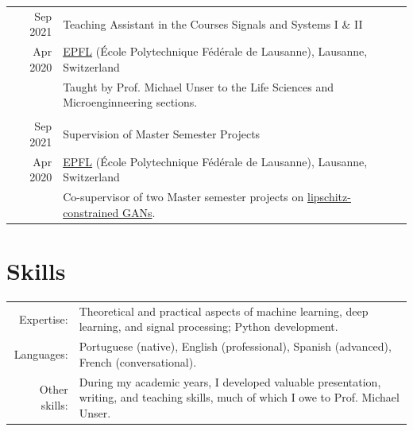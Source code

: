 \documentclass[a4paper,11pt]{article}
\def\datespace{-2pt}
\def\title-main-sep{4pt}
\newcommand{\optExtraSpace}{}
\newcommand{\sectionDevOps}{}
\newcommand{\optExtraSpace}{\vspace{5pt}}
\newcommand{\sectionDevOps}{
      DevOps:       &  Python, C, FastAPI, Pytest, PyTorch, CI/CD, Bash, Linux, MongoDB, Docker, Github Actions, Codecov, AWS, Fly.io, Better Stack \vspace{5pt}\\
    }
\begin{document}
    \begin{tabular}{r|p{13cm}}

	  {\small Sep 2021} & Teaching Assistant in the Courses Signals and Systems I \& II \\[\datespace]
	  {\small Apr 2020} & \small{\href{https://www.epfl.ch/en/}{EPFL} (École Polytechnique Fédérale de Lausanne), Lausanne, Switzerland} \\[\title-main-sep]
    & {\footnotesize Taught by Prof. Michael Unser to the Life Sciences and Microenginneering sections.} \\

    \multicolumn{2}{c}{} \\

    {\small Sep 2021} & Supervision of Master Semester Projects \\[\datespace]
    {\small Apr 2020} & \small{\href{https://www.epfl.ch/en/}{EPFL} (École Polytechnique Fédérale de Lausanne), Lausanne, Switzerland} \\[\title-main-sep]
    & \footnotesize{Co-supervisor of two Master semester projects on \href{https://bigwww.epfl.ch/teaching/projects/abstract.html?f=00388}{lipschitz-constrained GANs}.} \\

    \end{tabular}


    \vspace{15pt}
    \optExtraSpace

    \section{Skills}

    \begin{tabular}{rp{13cm}}
  	Expertise:  & Theoretical and practical aspects of machine learning, deep learning, and signal processing; Python development.
    \vspace{5pt}\\
    \sectionDevOps
    Languages: & Portuguese (native), English (professional), Spanish (advanced), French (conversational). \vspace{5pt}\\
  	Other skills: 	   & During my academic years, I developed valuable presentation, writing, and teaching skills, much of which I owe to Prof. Michael Unser.
    \end{tabular}
\end{document}
